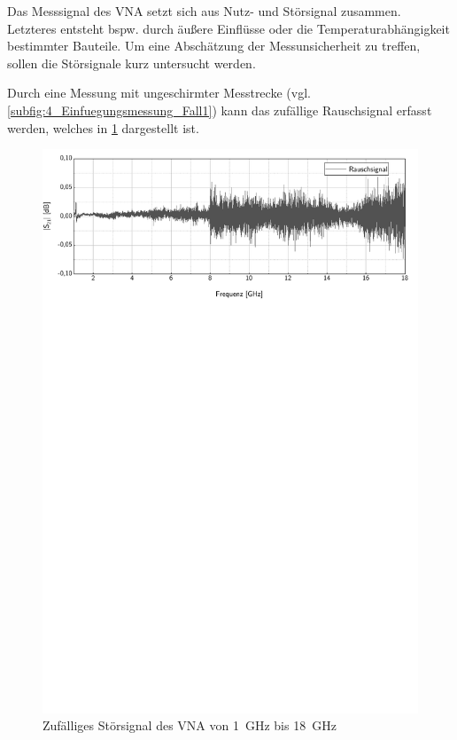 

Das Messsignal des VNA setzt sich aus Nutz- und Störsignal zusammen. Letzteres entsteht bspw. durch äußere Einflüsse oder die Temperaturabhängigkeit bestimmter Bauteile. Um eine Abschätzung der Messunsicherheit zu treffen, sollen die Störsignale kurz untersucht werden.
\par
\vspace{\linespace}
Durch eine Messung mit ungeschirmter Messtrecke (vgl. \Abb\ref{subfig:4_Einfuegungsmessung_Fall1}) kann das zufällige Rauschsignal erfasst werden, welches in \Abb\ref{fig:4_Stoersignal} dargestellt ist. 


\begin{figure}[ht]
    \centering
    \includegraphics[page = 1, width = .99\textwidth, trim = 0cm 18.1cm 0.3cm 0cm, clip]{Abbildungen/Kapitel4/Rauschsignal.pdf}
    \caption{Zufälliges Störsignal des VNA von \SI{1}{\giga\hertz} bis \SI{18}{\giga\hertz}}
    \label{fig:4_Stoersignal}
\end{figure}

